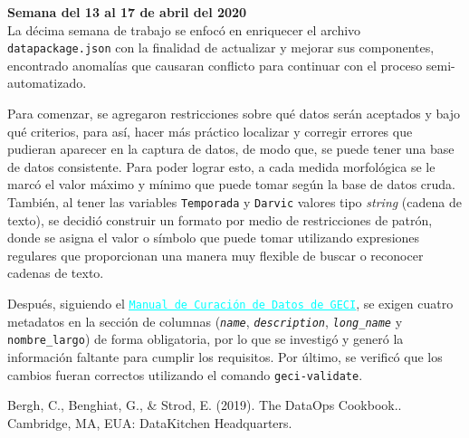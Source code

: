 \documentclass{article}
\begin{document}
    \textbf{Semana del 13 al 17 de abril del 2020} \\
    La décima semana de trabajo se enfocó en enriquecer el archivo \texttt{datapackage.json} con la finalidad de actualizar y mejorar sus componentes, encontrado anomalías que causaran conflicto para continuar con el proceso semi-automatizado.
    
    Para comenzar, se agregaron restricciones sobre qué datos serán aceptados y bajo qué criterios, para así, hacer más práctico localizar y corregir errores que pudieran aparecer en la captura de datos, de modo que, se puede tener una base de datos consistente. Para poder lograr esto, a cada medida morfológica se le marcó el valor máximo y mínimo que puede tomar según la base de datos cruda. También, al tener las variables \texttt{Temporada} y \texttt{Darvic} valores tipo \textit{string} (cadena de texto), se decidió construir un formato por medio de restricciones de patrón, donde se asigna el valor o símbolo que puede tomar utilizando expresiones regulares que proporcionan una manera muy flexible de buscar o reconocer cadenas de texto.
    
    Después, siguiendo el \href{https://docs.google.com/document/d/1A1JZQY_CZ0d_Mb_LW7WKS8r9ulPp6QvijFYbGCzR2yo/edit}{\textcolor{cyan}{\underline{\texttt{Manual de Curación de Datos de GECI}}}}, se exigen cuatro metadatos en la sección de columnas (\texttt{\textsl{name}}, \texttt{\textsl{description}}, \texttt{\textsl{long\_name}} y \texttt{nombre\_largo}) de forma obligatoria, por lo que se investigó y generó la información faltante para cumplir los requisitos. Por último, se verificó que los cambios fueran correctos utilizando el comando \texttt{geci-validate}.
    
\begin{thebibliography}{1} 
 Bergh, C., Benghiat, G., \& Strod, E. (2019). The DataOps Cookbook.. Cambridge, MA, EUA: DataKitchen Headquarters.
\end{thebibliography}
\end{document}
